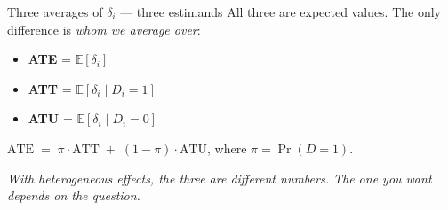 \documentclass[aspectratio=169,11pt]{beamer}
\begin{document}
\begin{frame}{Three averages of $\delta_i$ --- three estimands}
\vspace{0.4em}
All three are expected values. The only difference is \textit{whom we average over}:
\vspace{0.6em}
\begin{itemize}
  \item \textbf{ATE} \;=\; $\mathbb{E}[\delta_i]$ \hfill {}
  \item \textbf{ATT} \;=\; $\mathbb{E}[\delta_i \mid D_i = 1]$ \hfill {}
  \item \textbf{ATU} \;=\; $\mathbb{E}[\delta_i \mid D_i = 0]$ \hfill {}
\end{itemize}
\vspace{1em}
\begin{center}
\small
$\text{ATE} \;=\; \pi \cdot \text{ATT} \;+\; (1-\pi) \cdot \text{ATU}$, \quad where $\pi = \Pr(D=1)$.
\end{center}
\vspace{0.4em}
\begin{center}
\small\color{warmgray}\itshape With heterogeneous effects, the three are different numbers. The one you want depends on the question.
\end{center}
\end{frame}
\end{document}
